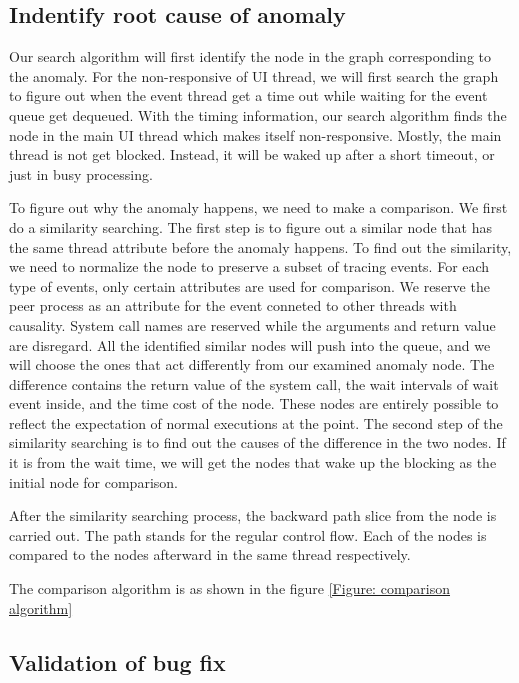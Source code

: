 \subsection{Indentify root cause of anomaly}
Our search algorithm will first identify the node in the graph corresponding to the anomaly. 
For the non-responsive of UI thread, we will first search the graph to figure out when the event thread get a time out while waiting for the event queue get dequeued.
With the timing information, our search algorithm finds the node in the main UI thread which makes itself non-responsive.
Mostly, the main thread is not get blocked.
Instead, it will be waked up after a short timeout, or just in busy processing.

To figure out why the anomaly happens, we need to make a comparison.
We first do a similarity searching.
The first step is to figure out a similar node that has the same thread attribute before the anomaly happens.
To find out the similarity, we need to normalize the node to preserve a subset of tracing events.
For each type of events, only certain attributes are used for comparison.
We reserve the peer process as an attribute for the event conneted to other threads with causality.
System call names are reserved while the arguments and return value are disregard. 
All the identified similar nodes will push into the queue, and we will choose the ones that act differently from our examined anomaly node.
The difference contains the return value of the system call, the wait intervals of wait event inside, and the time cost of the node.
These nodes are entirely possible to reflect the expectation of normal executions at the point.
The second step of the similarity searching is to find out the causes of the difference in the two nodes.
If it is from the wait time, we will get the nodes that wake up the blocking as the initial node for comparison.

After the similarity searching process, the backward path slice from the node is carried out.                           
The path stands for the regular control flow.                                                                 
Each of the nodes is compared to the nodes afterward in the same thread respectively.

The comparison algorithm is as shown in the figure \ref{Figure: comparison algorithm}
%
%
\subsection{Validation of bug fix}
